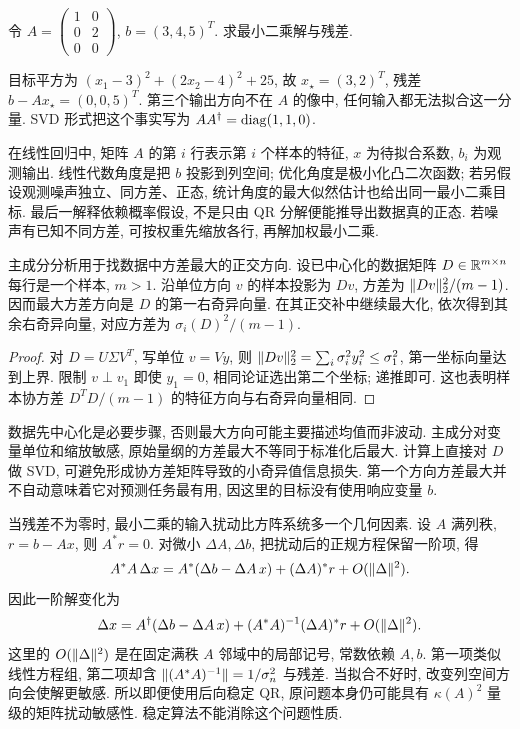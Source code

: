 \begin{example}
令 $A=\begin{pmatrix}1&0\\0&2\\0&0\end{pmatrix}$, $b=(3,4,5)^T$. 求最小二乘解与残差.
\end{example}
\begin{solution}
目标平方为 $(x_1-3)^2+(2x_2-4)^2+25$, 故 $x_\star=(3,2)^T$, 残差 $b-Ax_\star=(0,0,5)^T$. 第三个输出方向不在 $A$ 的像中, 任何输入都无法拟合这一分量. SVD 形式把这个事实写为 $AA^\dagger=\operatorname{diag}(1,1,0)$.
\end{solution}

在线性回归中, 矩阵 $A$ 的第 $i$ 行表示第 $i$ 个样本的特征, $x$ 为待拟合系数, $b_i$ 为观测输出. 线性代数角度是把 $b$ 投影到列空间; 优化角度是极小化凸二次函数; 若另假设观测噪声独立、同方差、正态, 统计角度的最大似然估计也给出同一最小二乘目标. 最后一解释依赖概率假设, 不是只由 QR 分解便能推导出数据真的正态. 若噪声有已知不同方差, 可按权重先缩放各行, 再解加权最小二乘.

主成分分析用于找数据中方差最大的正交方向. 设已中心化的数据矩阵 $D\in\mathbb R^{m\times n}$ 每行是一个样本, $m>1$. 沿单位方向 $v$ 的样本投影为 $Dv$, 方差为 $\lVert Dv\rVert_2^2/(m-1)$. 因而最大方差方向是 $D$ 的第一右奇异向量. 在其正交补中继续最大化, 依次得到其余右奇异向量, 对应方差为 $\sigma_i(D)^2/(m-1)$.
\begin{proof}
对 $D=U\Sigma V^T$, 写单位 $v=Vy$, 则 $\lVert Dv\rVert_2^2=\sum_i\sigma_i^2 y_i^2\le\sigma_1^2$, 第一坐标向量达到上界. 限制 $v\perp v_1$ 即使 $y_1=0$, 相同论证选出第二个坐标; 递推即可. 这也表明样本协方差 $D^TD/(m-1)$ 的特征方向与右奇异向量相同.
\end{proof}
数据先中心化是必要步骤, 否则最大方向可能主要描述均值而非波动. 主成分对变量单位和缩放敏感, 原始量纲的方差最大不等同于标准化后最大. 计算上直接对 $D$ 做 SVD, 可避免形成协方差矩阵导致的小奇异值信息损失. 第一个方向方差最大并不自动意味着它对预测任务最有用, 因这里的目标没有使用响应变量 $b$.

当残差不为零时, 最小二乘的输入扰动比方阵系统多一个几何因素. 设 $A$ 满列秩, $r=b-Ax$, 则 $A^*r=0$. 对微小 $\Delta A,\Delta b$, 把扰动后的正规方程保留一阶项, 得
\[
A^*A\,\Delta x
=A^*(\Delta b-\Delta A\,x)+(\Delta A)^*r+O(\lVert \Delta\rVert^2).
\]
因此一阶解变化为
\[
\Delta x=A^\dagger(\Delta b-\Delta A\,x)
+(A^*A)^{-1}(\Delta A)^*r+O(\lVert \Delta\rVert^2).
\]
这里的 $O(\lVert \Delta\rVert^2)$ 是在固定满秩 $A$ 邻域中的局部记号, 常数依赖 $A,b$. 第一项类似线性方程组, 第二项却含 $\lVert (A^*A)^{-1}\rVert=1/\sigma_n^2$ 与残差. 当拟合不好时, 改变列空间方向会使解更敏感. 所以即便使用后向稳定 QR, 原问题本身仍可能具有 $\kappa(A)^2$ 量级的矩阵扰动敏感性. 稳定算法不能消除这个问题性质.


